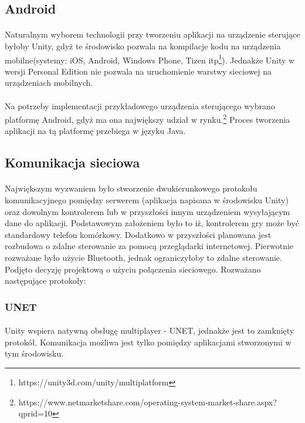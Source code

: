 \subsection{Android}
\paragraph{}
Naturalnym wyborem technologii przy tworzeniu aplikacji na urządzenie sterujące byłoby Unity, gdyż te środowisko pozwala na kompilacje kodu na urządzenia mobilne(systemy: iOS, Android, Windows Phone, Tizen itp\footnote{https://unity3d.com/unity/multiplatform}). Jednakże Unity w wersji Personal Edition nie pozwala na uruchomienie warstwy sieciowej na urządzeniach mobilnych.
\paragraph{}
Na potrzeby implementacji przykładowego urządzenia sterującego wybrano platformę Android, gdyż ma ona największy udział w rynku.\footnote{https://www.netmarketshare.com/operating-system-market-share.aspx?qprid=10} Proces tworzenia aplikacji na tą platformę przebiega w języku Java.

\subsection{Komunikacja sieciowa}
\paragraph{}
Największym wyzwaniem było stworzenie dwukierunkowego protokołu komunikacyjnego pomiędzy serwerem (aplikacja napisana w środowisku Unity) oraz dowolnym kontrolerem lub w przyszłości innym urządzeniem wysyłającym dane do aplikacji. Podstawowym założeniem było to iż, kontrolerem gry może być standardowy telefon komórkowy. Dodatkowo w przyszłości planowana jest rozbudowa o zdalne sterowanie za pomocą przeglądarki internetowej. Pierwotnie rozważane było użycie Bluetooth, jednak ograniczyłoby to zdalne sterowanie. Podjęto decyzję projektową o użyciu połączenia sieciowego. Rozważano następujące protokoły:

\subsubsection{UNET}
\paragraph{}
Unity wspiera natywną obsługę multiplayer - UNET, jednakże jest to zamknięty protokół. Komunikacja możliwa jest tylko pomiędzy aplikacjami stworzonymi w tym środowisku.

